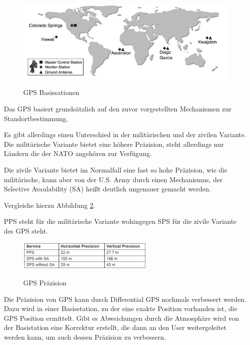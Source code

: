 \begin{figure}[h]
\centering
\includegraphics[width=0.99\textwidth]{ref/images/GPS_Basisstation.PNG}
\caption[GPS Basissationen]{GPS Basissationen}
\label{fig:GPS Basissationen}
\cite[S. 163]{Kuepper2005}
\end{figure}

Das GPS basiert grundsätzlich auf den zuvor vorgestellten Mechanismen zur Standortbestimmung. 

Es gibt allerdings einen Unterschied in der militärischen und der zivilen Variante. Die militärische Variante bietet eine höhere Präzision, steht allerdings nur Ländern die der NATO angehören zur Verfügung. 

Die zivile Variante bietet im Normalfall eine fast so hohe Präzision, wie die militärische, kann aber von der U.S. Army durch einen Mechanismus, der Selective Avaulability (SA) heißt deutlich ungenauer gemacht werden.

\cite[S. 194 - 196]{Schiller2004}

Vergleiche hierzu Abbildung \ref{fig:GPS Praezision}.

PPS steht für die militärische Variante wohingegen SPS für die zivile Variante des GPS steht.

\begin{figure}[h]
\centering
\includegraphics[width=0.6\textwidth]{ref/images/GPS_Praezision.PNG}
\caption[GPS Präzision]{GPS Präzision}
\label{fig:GPS Praezision}
\cite[S. 195]{Schiller2004}
\end{figure}

Die Präzision von GPS kann durch Differential GPS nochmals verbessert werden. Dazu wird in einer Basisstation, zu der eine exakte Position vorhanden ist, die GPS Position ermittelt. Gibt es Abweichungen durch die Atmosphäre wird von der Basistation eine Korrektur erstellt, die dann an den User weitergeleitet werden kann, um auch dessen Präzision zu verbessern.
\cite[S. 196]{Schiller2004}

